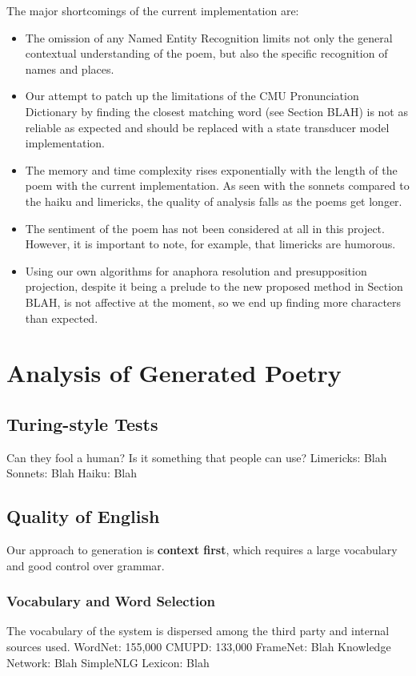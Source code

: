 The major shortcomings of the current implementation are:
\begin{itemize}
\item{The omission of any Named Entity Recognition limits not only the general contextual understanding of the poem, but also the specific recognition of names and places.}
\item{Our attempt to patch up the limitations of the CMU Pronunciation Dictionary by finding the closest matching word (see Section BLAH) is not as reliable as expected and should be replaced with a state transducer model implementation.}
\item{The memory and time complexity rises exponentially with the length of the poem with the current implementation. As seen with the sonnets compared to the haiku and limericks, the quality of analysis falls as the poems get longer.}
\item{The sentiment of the poem has not been considered at all in this project. However, it is important to note, for example, that limericks are humorous.}
\item{Using our own algorithms for anaphora resolution and presupposition projection, despite it being a prelude to the new proposed method in Section BLAH, is not affective at the moment, so we end up finding more characters than expected.}
\end{itemize}


\section{Analysis of Generated Poetry}


\subsection{Turing-style Tests}
Can they fool a human?
Is it something that people can use?
Limericks: Blah
Sonnets: Blah
Haiku: Blah


\subsection{Quality of English}
Our approach to generation is \textbf{context first}, which requires a large vocabulary and good control over grammar.
\subsubsection{Vocabulary and Word Selection}
The vocabulary of the system is dispersed among the third party and internal sources used.
WordNet: 155,000
CMUPD: 133,000
FrameNet: Blah
Knowledge Network: Blah
SimpleNLG Lexicon: Blah


